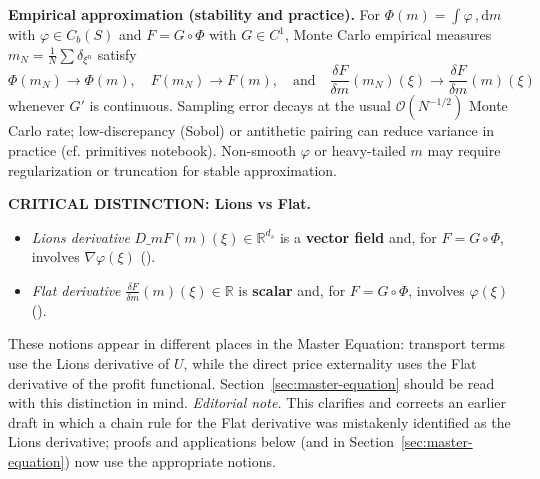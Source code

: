 ﻿\documentclass[11pt,letterpaper,oneside]{article}
\numberwithin{equation}{section}
\newcommand{\R}{\mathbb{R}}
\newcommand{\1}{\mathbf{1}}
\newcommand{\diff}{,\mathrm{d}}
\newcommand{\Dm}{D\_m}
\begin{document}
\begin{tcolorbox}[mathstyle]
\textbf{Empirical approximation (stability and practice).}
For $\Phi(m)=\int \varphi\,\diff m$ with $\varphi\in C_b(S)$ and $F=G\circ\Phi$ with $G\in C^1$, Monte Carlo empirical measures $m_N=\tfrac1N\sum\delta_{\xi^n}$ satisfy
\[\Phi(m_N)\to\Phi(m),\quad F(m_N)\to F(m),\quad \text{and}\quad \frac{\delta F}{\delta m}(m_N)(\xi)\to\frac{\delta F}{\delta m}(m)(\xi)\]
whenever $G'$ is continuous. Sampling error decays at the usual $\mathcal O(N^{-1/2})$ Monte Carlo rate; low-discrepancy (Sobol) or antithetic pairing can reduce variance in practice (cf. primitives notebook). Non-smooth $\varphi$ or heavy-tailed $m$ may require regularization or truncation for stable approximation.
\end{tcolorbox}

\begin{tcolorbox}[mathstyle]
\textbf{CRITICAL DISTINCTION: Lions vs Flat.}
\begin{itemize}[leftmargin=1.15em,itemsep=0.25em]
  \item \emph{Lions derivative} $\Dm F(m)(\xi)\in\R^{d_s}$ is a \textbf{vector field} and, for $F=G\circ\Phi$, involves $\nabla\varphi(\xi)$ ().
  \item \emph{Flat derivative} $\tfrac{\delta F}{\delta m}(m)(\xi)\in\R$ is \textbf{scalar} and, for $F=G\circ\Phi$, involves $\varphi(\xi)$ ().
\end{itemize}
These notions appear in different places in the Master Equation: transport terms use the Lions derivative of $U$, while the direct price externality uses the Flat derivative of the profit functional. Section~\ref{sec:master-equation} should be read with this distinction in mind.\newline
\emph{Editorial note.} This clarifies and corrects an earlier draft in which a chain rule for the Flat derivative was mistakenly identified as the Lions derivative; proofs and applications below (and in Section~\ref{sec:master-equation}) now use the appropriate notions.
\end{tcolorbox}
\end{document}
